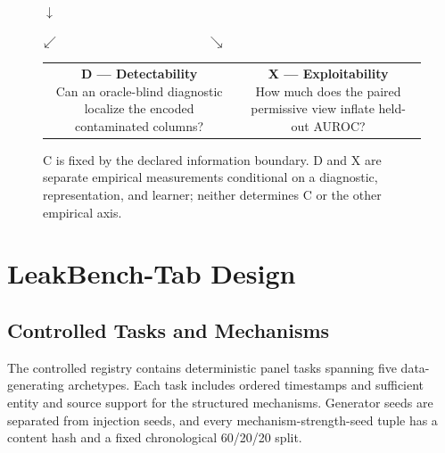 \documentclass[letterpaper]{article}
\begin{document}
\begin{figure}[t]
\centering
\small
\setlength{\fboxsep}{4pt}
\par\vspace{-0.15em}$\downarrow$\par\vspace{-0.15em}
\par\vspace{-0.15em}$\swarrow\hspace{0.36\columnwidth}\searrow$\par\vspace{-0.15em}
\begin{tabular}{@{}cc@{}}
\fbox{\parbox[t]{0.41\columnwidth}{\centering
\textbf{D --- Detectability}\\
Can an oracle-blind diagnostic localize the encoded contaminated columns?}} &
\fbox{\parbox[t]{0.41\columnwidth}{\centering
\textbf{X --- Exploitability}\\
How much does the paired permissive view inflate held-out AUROC?}}
\end{tabular}
\caption{C is fixed by the declared information boundary.  D and X are
separate empirical measurements conditional on a diagnostic, representation,
and learner; neither determines C or the other empirical axis.}
\label{fig:cdx-framework}
\end{figure}

\section{LeakBench-Tab Design}
\label{sec:design}
\subsection{Controlled Tasks and Mechanisms}
The controlled registry contains \LBControlledTaskCount{} deterministic panel
tasks spanning five data-generating archetypes.  Each task includes ordered
timestamps and sufficient entity and source support for the structured
mechanisms.  Generator seeds are separated from injection seeds, and every
mechanism-strength-seed tuple has a content hash and a fixed chronological
60/20/20 split.
\end{document}
